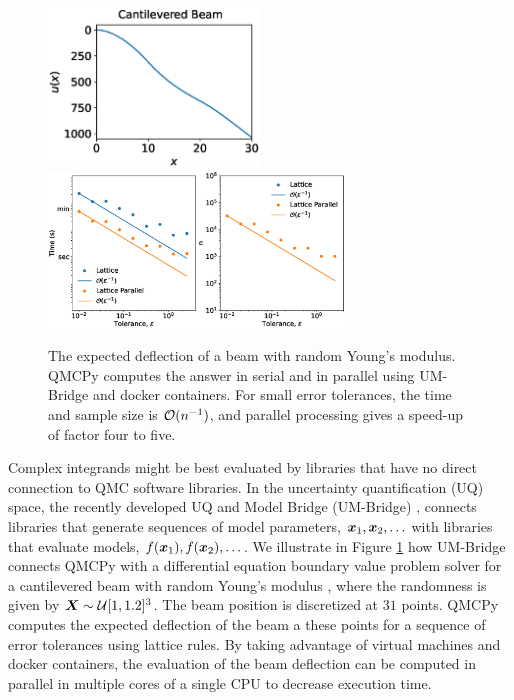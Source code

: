 \documentclass[graybox]{svmult}
\begin{document}
\begin{figure}
    \centering
    \includegraphics[width=0.5\textwidth]{cantileveredbeam.eps}
    \includegraphics[width=0.7\textwidth]{ldparallelbeam.eps}
    \caption{The expected deflection of a beam with random Young's modulus.  QMCPy computes the answer in serial and in parallel using UM-Bridge and docker containers.  For small error tolerances, the time and sample size is ${\mathcal{O}}(n^{-1})$, and parallel processing gives a speed-up of factor four to five.}
    \label{fig:beam}
\end{figure}

Complex integrands might be best evaluated by libraries that have no direct connection to QMC software libraries.  In the uncertainty quantification (UQ) space, the recently developed UQ and Model Bridge (UM-Bridge) \cite{umbridge}, connects libraries that generate sequences of model parameters, ${\boldsymbol{x}}_1, {\boldsymbol{x}}_2, \ldots$ with libraries that evaluate models, $f({\boldsymbol{x}}_1), f({\boldsymbol{x}}_2), \ldots$.  We illustrate in Figure \ref{fig:beam} how UM-Bridge connects QMCPy with a differential equation boundary value problem solver for a cantilevered beam with random Young's modulus \cite{ParSee22a}, where the randomness is given by ${\boldsymbol{X}} \sim {\mathcal{U}}[1,1.2]^3$.  The beam position is discretized at $31$ points.  QMCPy computes the expected deflection of the beam a these points for a sequence of error tolerances using lattice rules.  By taking advantage of virtual machines and docker containers, the evaluation of the beam deflection can be computed in parallel in multiple cores of a single CPU to decrease execution time.
\end{document}
